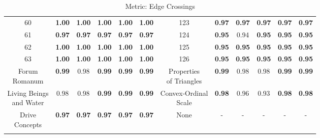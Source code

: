 \documentclass{article}
\begin{document}
{\begin{longtable}{cccccc@{\qquad}cccccc}
60 & \textbf{1.00} & \textbf{1.00} & \textbf{1.00} & \textbf{1.00} & \textbf{1.00} & 123 & \textbf{0.97} & \textbf{0.97} & \textbf{0.97} & \textbf{0.97} & \textbf{0.97} \\
61 & \textbf{0.97} & \textbf{0.97} & \textbf{0.97} & \textbf{0.97} & \textbf{0.97} & 124 & \textbf{0.95} & 0.94 & \textbf{0.95} & \textbf{0.95} & \textbf{0.95} \\
62 & \textbf{1.00} & \textbf{1.00} & \textbf{1.00} & \textbf{1.00} & \textbf{1.00} & 125 & \textbf{0.95} & \textbf{0.95} & \textbf{0.95} & \textbf{0.95} & \textbf{0.95} \\
63 & \textbf{1.00} & \textbf{1.00} & \textbf{1.00} & \textbf{1.00} & \textbf{1.00} & 126 & \textbf{0.95} & \textbf{0.95} & \textbf{0.95} & \textbf{0.95} & \textbf{0.95} \\
\makecell[c]{Forum \\ Romanum} & \textbf{0.99} & 0.98 & \textbf{0.99} & \textbf{0.99} & \textbf{0.99} & \makecell[c]{Properties \\ of Triangles} & \textbf{0.99} & 0.98 & 0.98 & \textbf{0.99} & \textbf{0.99} \\
\makecell[c]{Living Beings \\ and Water} & 0.98 & 0.98 & \textbf{0.99} & \textbf{0.99} & \textbf{0.99} & \makecell[c]{Convex-Ordinal \\ Scale} & \textbf{0.98} & 0.96 & 0.93 & \textbf{0.98} & \textbf{0.98} \\
\makecell[c]{Drive \\ Concepts} & \textbf{0.97} & \textbf{0.97} & \textbf{0.97} & \textbf{0.97} & \textbf{0.97} & None & - & - & - & - & - \\
\caption{Metric: Edge Crossings} \\
\end{longtable}
}
\clearpage
\end{document}
